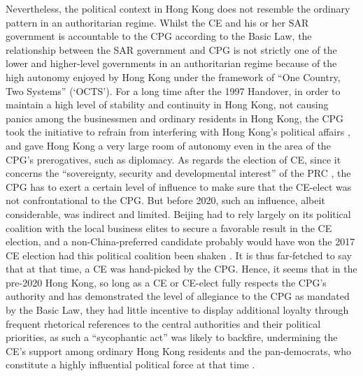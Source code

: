 \documentclass[9pt,a4paper,twocolumn,twoside]{rho-class/rho}
\begin{document}
        Nevertheless, the political context in Hong Kong does not resemble the ordinary pattern in an authoritarian regime. Whilst the CE and his or her SAR government is accountable 
        to the CPG according to the Basic Law, the relationship between the SAR government and CPG is not strictly one of the lower and higher-level governments in an authoritarian regime because of the high autonomy 
        enjoyed by Hong Kong under the framework of ``One Country, Two Systems'' (`OCTS'). For a long time after the 1997 Handover, in order to maintain a high level of stability and 
        continuity in Hong Kong, not causing panics among the businessmen and ordinary residents in Hong Kong, the CPG took the initiative to refrain from interfering with Hong Kong's 
        political affairs \parencite{so2011onecountry}, and gave Hong Kong a very large room of autonomy even in the area of the CPG's prerogatives, such as diplomacy. As regards the 
        election of CE, since it concerns the ``sovereignty, security and developmental interest'' of the PRC \parencite[18]{chen2017law}, the CPG has to exert a certain level of influence 
        to make sure that the CE-elect was not confrontational to the CPG. But before 2020, such an influence, albeit considerable, was indirect and limited. Beijing had to rely largely 
        on its political coalition with the local business elites to secure a favorable result in the CE election, and a non-China-preferred candidate probably would have won the 2017 
        CE election had this political coalition been shaken  \parencite{kwong2025electoral}. It is thus far-fetched to say that at that time, a CE was hand-picked by the CPG. Hence, 
        it seems that in the pre-2020 Hong Kong, so long as a CE or CE-elect fully respects the CPG's authority and has demonstrated the level of allegiance to the CPG as mandated by 
        the Basic Law, they had little incentive to display additional loyalty through frequent rhetorical references to the central authorities and their political priorities, as such 
        a ``sycophantic act'' was likely to backfire, undermining the CE's support among ordinary Hong Kong residents and the pan-democrats, who constitute a highly influential 
        political force at that time \parencite{ng2020recontextualisation}.
\end{document}
